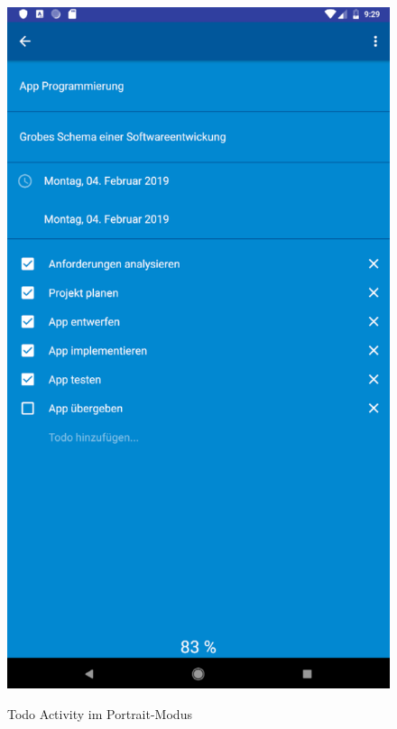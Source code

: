 \begin{figure}[H]
\centering
\begin{minipage}[t]{1\textwidth} %
\caption{Todo Activity im Portrait-Modus} %
\includegraphics[width=1\textwidth]{img/Todo_portrait}\\ %
\end{minipage}
\end{figure}

